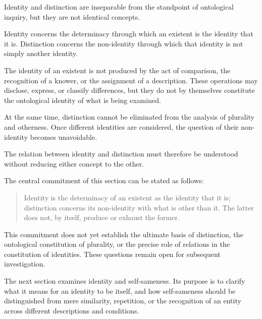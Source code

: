 Identity and distinction are inseparable
from the standpoint of ontological inquiry,
but they are not identical concepts.

Identity concerns the determinacy through
which an existent is the identity that
it is. Distinction concerns the non-identity
through which that identity is not simply
another identity.

The identity of an existent is not produced
by the act of comparison, the recognition
of a knower, or the assignment of a
description. These operations may disclose,
express, or classify differences, but
they do not by themselves constitute
the ontological identity of what is
being examined.

At the same time, distinction cannot
be eliminated from the analysis of
plurality and otherness. Once different
identities are considered, the question
of their non-identity becomes unavoidable.

The relation between identity and
distinction must therefore be understood
without reducing either concept to
the other.

The central commitment of this section
can be stated as follows:

\begin{quote}
Identity is the determinacy of an existent
as the identity that it is; distinction
concerns its non-identity with what is
other than it. The latter does not,
by itself, produce or exhaust the former.
\end{quote}

This commitment does not yet establish
the ultimate basis of distinction, the
ontological constitution of plurality,
or the precise role of relations in
the constitution of identities. These
questions remain open for subsequent
investigation.

The next section examines identity
and self-sameness. Its purpose is to
clarify what it means for an identity
to be itself, and how self-sameness
should be distinguished from mere
similarity, repetition, or the recognition
of an entity across different descriptions
and conditions.
